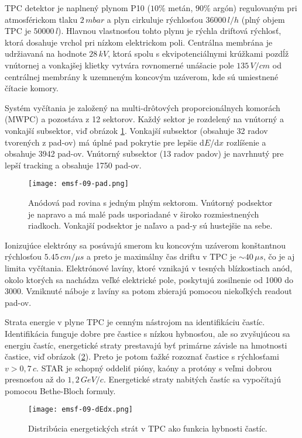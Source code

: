 \documentclass[../../main.tex]{subfiles}
\begin{document}
TPC detektor je naplnený plynom P10 ($10\%$ metán, $90\%$ argón) regulovaným pri atmosférickom tlaku $2\,\unit{mbar}$ a plyn cirkuluje rýchlosťou $36 000\,\unit{l/h}$ (plný objem TPC je $50 000\,\unit{l}$). Hlavnou vlastnosťou tohto plynu je rýchla driftová rýchlosť, ktorá dosahuje vrchol pri nízkom elektrickom poli. Centrálna membrána je udržiavaná na hodnote $28\,\unit{kV}$, ktorá spolu s ekvipotenciálnymi krúžkami pozdĺž vnútornej a vonkajšej klietky vytvára rovnomerné unášacie pole $135\,\unit{V/cm}$ od centrálnej membrány k uzemneným koncovým uzáverom, kde sú umiestnené čítacie komory.

Systém vyčítania je založený na multi-drôtových proporcionálnych komorách (MWPC) a pozostáva z 12 sektorov. Každý sektor je rozdelený na vnútorný a vonkajší subsektor, viď obrázok \ref{em9:fig:pad}. Vonkajší subsektor (obsahuje 32 radov tvorených z pad-ov) má úplné pad pokrytie pre lepšie d$E$/d$x$ rozlíšenie a obsahuje 3942 pad-ov. Vnútorný subsektor (13 radov padov) je navrhnutý pre lepší tracking a obsahuje 1750 pad-ov.

\begin{figure}[!h]
\texttt{[image: emsf-09-pad.png]}
\centering
\caption{Anódová pad rovina s jedným plným sektorom. Vnútorný podsektor je napravo a má malé pads usporiadané v široko rozmiestnených riadkoch. Vonkajší podsektor je naľavo a pad-y sú hustejšie na sebe.}
\label{em9:fig:pad}
\end{figure}

Ionizujúce elektróny sa posúvajú smerom ku koncovým uzáverom konštantnou rýchlosťou $5.45\,\unit{cm/\mu s}$ a preto je maximálny čas driftu v TPC je $\sim \unit{40\,\mu s}$, čo je aj limita vyčítania. Elektrónové lavíny, ktoré vznikajú v tesných blízkostiach anód, okolo ktorých sa nachádza veľké elektrické pole, poskytujú zosilnenie od 1000 do 3000. Vzniknuté náboje z lavíny sa potom zbierajú pomocou niekoľkých readout pad-ov.

Strata energie v plyne TPC je cenným nástrojom na identifikáciu častíc. Identifikácia funguje dobre pre častice s nízkou hybnosťou, ale so zvyšujúcou sa energiu častíc, energetické straty prestavajú byť primárne závisle na hmotnosti častice, viď obrázok (\ref{em9:fig:dEdx}). Preto je potom ťažké rozoznať častice s rýchlosťami $v> 0,7\,c$. STAR je schopný oddeliť pióny, kaóny a protóny s veľmi dobrou presnosťou až do $1,2\,\unit{GeV}/c$. Energetické straty nabitých častíc sa vypočítajú pomocou Bethe-Bloch formuly.

\begin{figure}[!h]
\texttt{[image: emsf-09-dEdx.png]}
\centering
\caption{Distribúcia energetických strát v TPC ako funkcia hybnosti častíc.}
\label{em9:fig:dEdx}
\end{figure}
\end{document}
